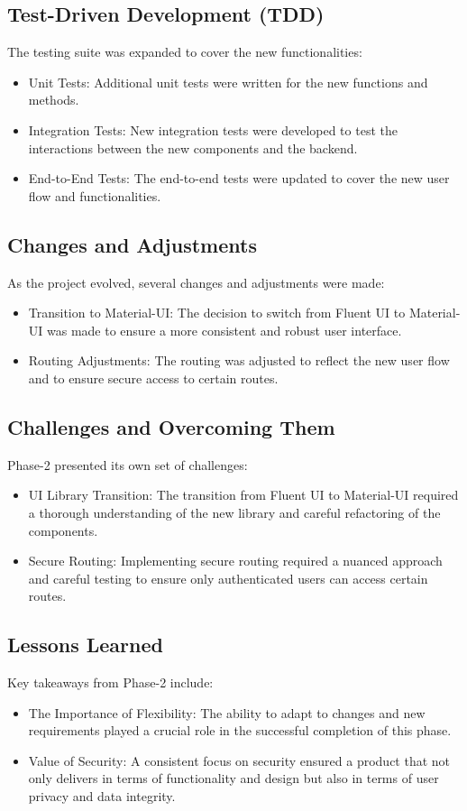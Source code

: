 \documentclass[11pt]{article}
\begin{document}
\subsection{Test-Driven Development (TDD)}
\label{sec:org3ee41c1}
The testing suite was expanded to cover the new functionalities:
\begin{itemize}
\item Unit Tests: Additional unit tests were written for the new functions and
methods.
\item Integration Tests: New integration tests were developed to test the
interactions between the new components and the backend.
\item End-to-End Tests: The end-to-end tests were updated to cover the new user
flow and functionalities.
\end{itemize}

\subsection{Changes and Adjustments}
\label{sec:org44ec6cf}
As the project evolved, several changes and adjustments were made:
\begin{itemize}
\item Transition to Material-UI: The decision to switch from Fluent UI to
Material-UI was made to ensure a more consistent and robust user
interface.
\item Routing Adjustments: The routing was adjusted to reflect the new user flow
and to ensure secure access to certain routes.
\end{itemize}

\subsection{Challenges and Overcoming Them}
\label{sec:org078c383}
Phase-2 presented its own set of challenges:
\begin{itemize}
\item UI Library Transition: The transition from Fluent UI to Material-UI
required a thorough understanding of the new library and careful
refactoring of the components.
\item Secure Routing: Implementing secure routing required a nuanced approach
and careful testing to ensure only authenticated users can access certain
routes.
\end{itemize}

\subsection{Lessons Learned}
\label{sec:org2f2ff78}
Key takeaways from Phase-2 include:
\begin{itemize}
\item The Importance of Flexibility: The ability to adapt to changes and new
requirements played a crucial role in the successful completion of this
phase.
\item Value of Security: A consistent focus on security ensured a product that
not only delivers in terms of functionality and design but also in terms
of user privacy and data integrity.
\end{itemize}
\end{document}
